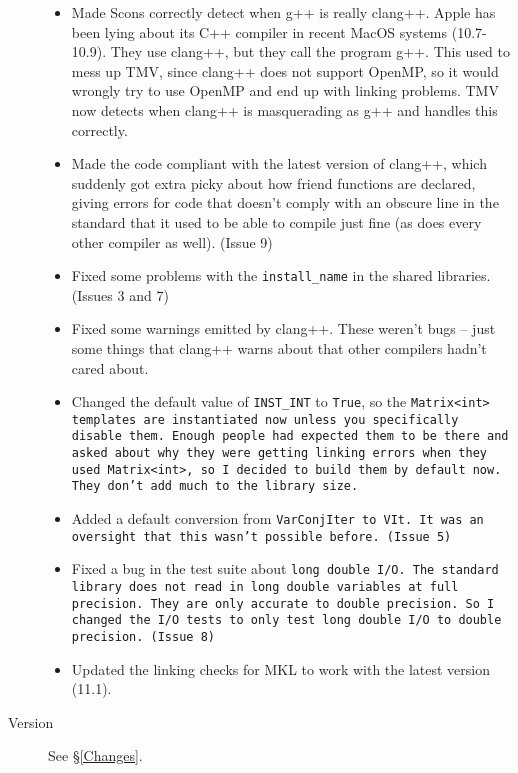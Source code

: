 \begin{description}
\begin{itemize}
\item
Made Scons correctly detect when g++ is really clang++.  Apple has been lying about
its C++ compiler in recent MacOS systems (10.7-10.9).  They use clang++,
but they call the program g++.  This used to mess up TMV, since clang++ 
does not support OpenMP, so it would wrongly try to use OpenMP and end up 
with linking problems.  TMV now detects when clang++ is masquerading as
g++ and handles this correctly.

\item
Made the code compliant with the latest version of clang++, which suddenly
got extra picky about how friend functions are declared, giving errors
for code that doesn't comply with an obscure line in the standard that 
it used to be able to compile just fine (as does every other compiler as
well).  (Issue 9)

\item
Fixed some problems with the \texttt{install\_name} in the shared libraries.  
(Issues 3 and 7)

\item
Fixed some warnings emitted by clang++.  These weren't bugs -- just some
things that clang++ warns about that other compilers hadn't cared about.

\item
Changed the default value of \texttt{INST\_INT} to \texttt{True}, so the \tt{Matrix<int>}
templates are instantiated now unless you specifically disable them.  Enough people
had expected them to be there and asked about why they were getting 
linking errors when they used \tt{Matrix<int>}, so I decided to build them
by default now.  They don't add much to the library size.

\item
Added a default conversion from \tt{VarConjIter} to \tt{VIt}.  It was an oversight
that this wasn't possible before.  (Issue 5)

\item 
Fixed a bug in the test suite about \tt{long double} I/O.  The standard library does
not read in \tt{long double} variables at full precision.  They are only accurate to
double precision.  So I changed the I/O tests to only test \tt{long double} I/O
to double precision.  (Issue 8)

\item
Updated the linking checks for MKL to work with the latest version (11.1).

\end{itemize}

\item[Version \tmvversion] See \S\ref{Changes}.

\end{description}
